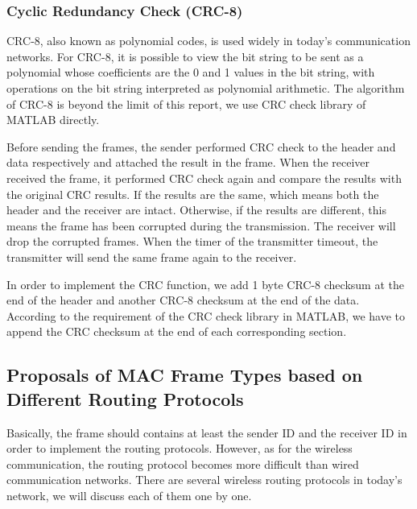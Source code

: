 \subsubsection{Cyclic Redundancy Check (CRC-8)}

CRC-8, also known as polynomial codes, is used widely in today's communication networks. For CRC-8, it is possible to view the bit string to be sent as a polynomial whose coefficients are the 0 and 1 values in the bit string, with operations on the bit string interpreted as polynomial arithmetic. The algorithm of CRC-8 is beyond the limit of this report, we use CRC check library of MATLAB directly. 

Before sending the frames, the sender performed CRC check to the header and data respectively and attached the result in the frame. When the receiver received the frame, it performed CRC check again and compare the results with the original CRC results. If the results are the same, which means both the header and the receiver are intact. Otherwise, if the results are different, this means the frame has been corrupted during the transmission. The receiver will drop the corrupted frames. When the timer of the transmitter timeout, the transmitter will send the same frame again to the receiver. 

In order to implement the CRC function, we add 1 byte CRC-8 checksum at the end of the header and another CRC-8 checksum at the end of the data. According to the requirement of the CRC check library in MATLAB, we have to append the CRC checksum at the end of each corresponding section. 



\subsection{Proposals of MAC Frame Types based on Different Routing Protocols}

Basically, the frame should contains at least the sender ID and the receiver ID in order to implement the routing protocols. However, as for the wireless communication, the routing protocol becomes more difficult than wired communication networks. There are several wireless routing protocols in today's network, we will discuss each of them one by one. 

